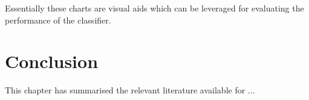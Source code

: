 Essentially these charts are visual aids which can be leveraged for evaluating the performance of the classifier. 



\section{Conclusion}\label{sotaConc}
This chapter has summarised the relevant literature available for ...

